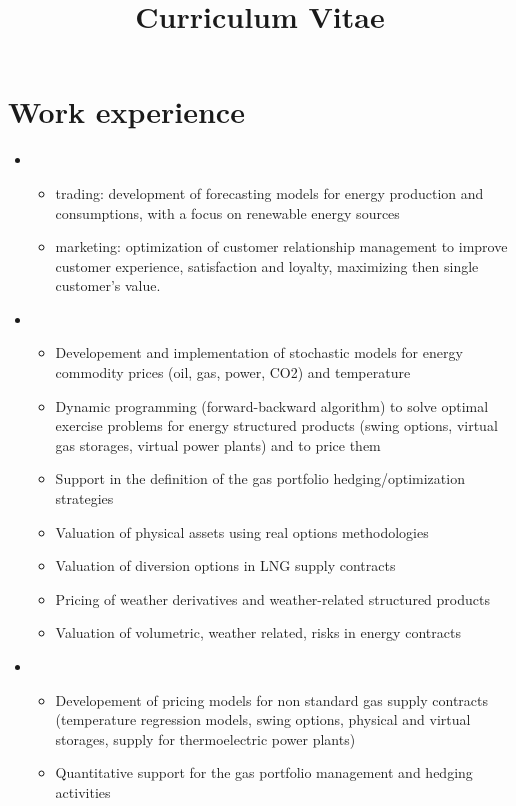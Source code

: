 \documentclass[11pt,a4paper,sans]{moderncv}        %
\title{Curriculum Vitae}                               %
\begin{document}
\makecvtitle

\section{Work experience}

\begin{itemize}
\item{}
\begin{itemize}
\item trading: development of forecasting models for energy production and consumptions, with a focus on renewable energy sources
\item marketing: optimization of customer relationship management to improve customer experience, satisfaction and loyalty, maximizing then single customer's value.

\end{itemize}

\item{}
\begin{itemize}
\item {Developement and implementation of stochastic models for energy commodity prices (oil, gas, power, CO2) and temperature}
\item {Dynamic programming (forward-backward algorithm) to solve optimal exercise problems for energy structured products (swing options, virtual gas storages, virtual power plants) and to price them}
\item {Support in the definition of the gas portfolio hedging/optimization strategies}
\item {Valuation of physical assets using real options methodologies}
\item {Valuation of diversion options in LNG supply contracts}
\item {Pricing of weather derivatives and weather-related structured products}
\item {Valuation of volumetric, weather related, risks in energy contracts}
\end{itemize}
\item{
\begin{itemize}
\item {Developement of pricing models for non standard gas supply contracts (temperature regression models, swing options, physical and virtual storages, supply for thermoelectric power plants)}
\item {Quantitative support for the gas portfolio management and hedging activities}
\end{itemize}
}
\end{itemize}
\end{document}
